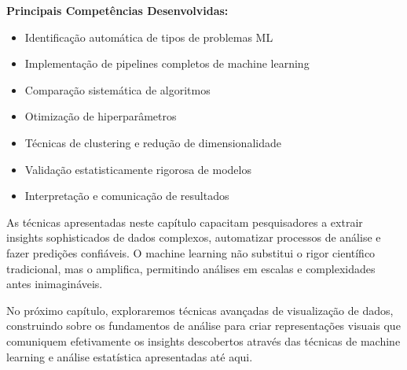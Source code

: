 \begin{examplebox}
\textbf{Principais Competências Desenvolvidas:}
\begin{itemize}
    \item Identificação automática de tipos de problemas ML
    \item Implementação de pipelines completos de machine learning
    \item Comparação sistemática de algoritmos
    \item Otimização de hiperparâmetros
    \item Técnicas de clustering e redução de dimensionalidade
    \item Validação estatisticamente rigorosa de modelos
    \item Interpretação e comunicação de resultados
\end{itemize}
\end{examplebox}

As técnicas apresentadas neste capítulo capacitam pesquisadores a extrair insights sophisticados de dados complexos, automatizar processos de análise e fazer predições confiáveis. O machine learning não substitui o rigor científico tradicional, mas o amplifica, permitindo análises em escalas e complexidades antes inimagináveis.

No próximo capítulo, exploraremos técnicas avançadas de visualização de dados, construindo sobre os fundamentos de análise para criar representações visuais que comuniquem efetivamente os insights descobertos através das técnicas de machine learning e análise estatística apresentadas até aqui.